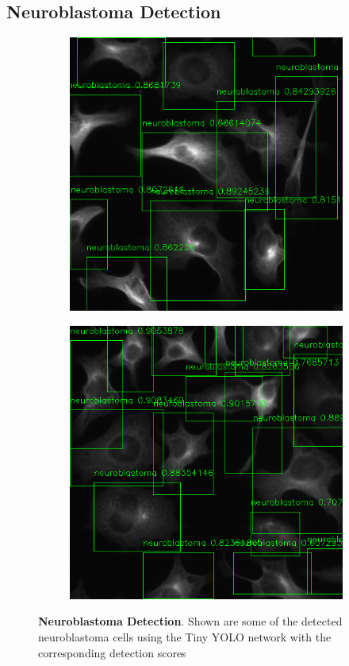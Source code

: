 \documentclass[journal]{IEEEtran}
\begin{document}
\subsection{Neuroblastoma Detection}
\begin{figure}
\centering
\begin{subfigure}[b]{0.9\linewidth}
\includegraphics[width=\linewidth]{110084.png}
\caption{}
\end{subfigure}\vspace{2pt}
\begin{subfigure}[b]{0.9\linewidth}
\includegraphics[width=\linewidth]{110085.png}
\caption{}
\end{subfigure}
\caption{\textbf{Neuroblastoma Detection}. Shown are some of the detected neuroblastoma cells using the Tiny YOLO network with the corresponding detection scores}
\label{fig:yolo_results}
\end{figure}
\end{document}
